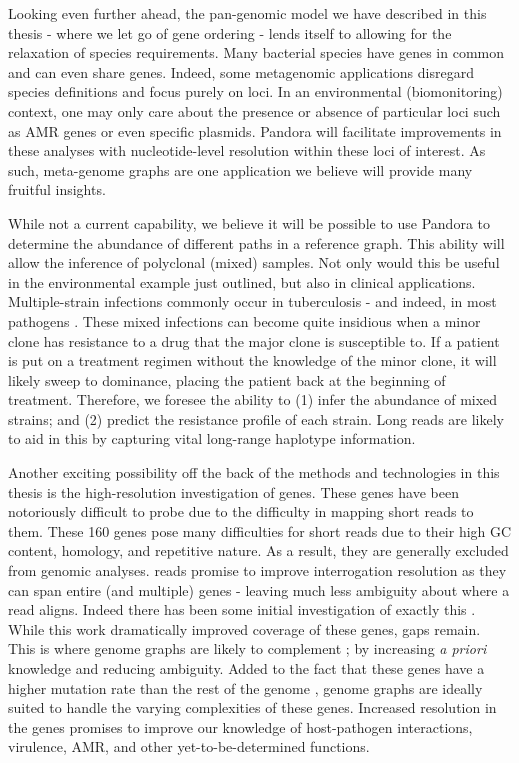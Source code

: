 Looking even further ahead, the pan-genomic model we have described in this thesis - where we let go of gene ordering - lends itself to allowing for the relaxation of species requirements. Many bacterial species have genes in common and can even share genes. Indeed, some metagenomic applications disregard species definitions and focus purely on loci. In an environmental (biomonitoring) context, one may only care about the presence or absence of particular loci such as AMR genes or even specific plasmids. Pandora will facilitate improvements in these analyses with nucleotide-level resolution within these loci of interest. As such, meta-genome graphs are one application we believe will provide many fruitful insights.

While not a current capability, we believe it will be possible to use Pandora to determine the abundance of different paths in a reference graph. This ability will allow the inference of polyclonal (mixed) samples. Not only would this be useful in the environmental example just outlined, but also in clinical applications. Multiple-strain infections commonly occur in tuberculosis \cite{Cohen2012} - and indeed, in most pathogens \cite{Balmer2011}. These mixed infections can become quite insidious when a minor clone has resistance to a drug that the major clone is susceptible to. If a patient is put on a treatment regimen without the knowledge of the minor clone, it will likely sweep to dominance, placing the patient back at the beginning of treatment. Therefore, we foresee the ability to (1) infer the abundance of mixed strains; and (2) predict the resistance profile of each strain. Long \ont{} reads are likely to aid in this by capturing vital long-range haplotype information.

Another exciting possibility off the back of the methods and technologies in this thesis is the high-resolution investigation of \ppe{} genes. These genes have been notoriously difficult to probe due to the difficulty in mapping short reads to them. These 160 genes pose many difficulties for short reads due to their high GC content, homology, and repetitive nature. As a result, they are generally excluded from genomic analyses. \ont{} reads promise to improve interrogation resolution as they can span entire (and multiple) \ppe{} genes - leaving much less ambiguity about where a read aligns. Indeed there has been some initial investigation of exactly this \cite{bainomugisa2018}. While this work dramatically improved coverage of these genes, gaps remain. This is where genome graphs are likely to complement \ont{}; by increasing \textit{a priori} knowledge and reducing ambiguity. Added to the fact that these genes have a higher mutation rate than the rest of the genome \cite{bainomugisa2018}, genome graphs are ideally suited to handle the varying complexities of these genes. Increased resolution in the \ppe{} genes promises to improve our knowledge of \mtb{} host-pathogen interactions, virulence, AMR, and other yet-to-be-determined functions.

